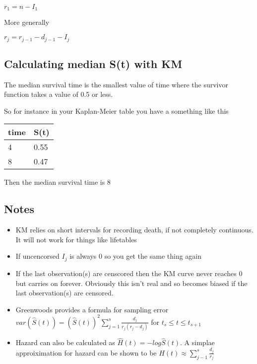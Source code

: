 \documentclass[
  letterpaper,
  DIV=11,
  numbers=noendperiod]{scrreprt}
\providecommand{\tightlist}{%
  \setlength{\itemsep}{0pt}\setlength{\parskip}{0pt}}\usepackage{longtable,booktabs,array}
\begin{document}
\(r_1 = n - I_1\)

More generally

\(r_j = r_{j-1} - d_{j-1} - I_j\)

\hypertarget{calculating-median-st-with-km}{%
\subsection{Calculating median S(t) with
KM}\label{calculating-median-st-with-km}}

The median survival time is the smallest value of time where the
survivor function takes a value of 0.5 or less.

So for instance in your Kaplan-Meier table you have a something like
this

\begin{longtable}[]{@{}ll@{}}
\toprule()
time & S(t) \\
\midrule()
\endhead
4 & 0.55 \\
8 & 0.47 \\
\bottomrule()
\end{longtable}

Then the median survival time is 8

\hypertarget{notes-1}{%
\subsection{Notes}\label{notes-1}}

\begin{itemize}
\tightlist
\item
  KM relies on short intervals for recording death, if not completely
  continuous. It will not work for things like lifetables
\item
  If uncencorsed \(I_j\) is always 0 so you get the same thing again
\item
  If the last observation(s) are censcored then the KM curve never
  reaches 0 but carries on forever. Obviously this isn't real and so
  becomes biased if the last observation(s) are censored.
\item
  Greenwoods provides a formula for sampling error
  \(var(\hat{S}(t)) = (\hat{S}(t))^2 \sum^s_{j=1} \frac{d_j}{r_j(r_j - d_j)}\)
  for \(t_s\leq t \leq t_{s+1}\)
\item
  Hazard can also be calculated as \(\hat{H}(t) = -log\hat{S}(t)\). A
  simplae approiximation for hazard can be shown to be
  \(H(t) \approx \sum_{j-1}^s\frac{d_j}{r_j}\)
\end{itemize}
\end{document}

